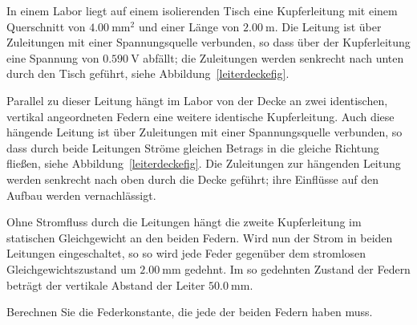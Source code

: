 In einem Labor liegt auf einem isolierenden Tisch eine Kupferleitung mit einem Querschnitt von \(\SI{4,00}{\milli\meter\squared}\) und einer Länge von \(\SI{2,00}{\meter}\). Die Leitung ist über Zuleitungen mit einer Spannungsquelle verbunden, so dass über der Kupferleitung eine Spannung von \(\SI{0,590}{\volt}\) abfällt; die Zuleitungen werden senkrecht nach unten durch den Tisch geführt, siehe Abbildung~\ref{leiterdeckefig}.

Parallel zu dieser Leitung hängt im Labor von der Decke an zwei identischen, vertikal angeordneten Federn eine weitere identische Kupferleitung. Auch diese hängende Leitung ist über Zuleitungen mit einer Spannungsquelle verbunden, so dass durch beide Leitungen Ströme gleichen Betrags in die gleiche Richtung fließen, siehe Abbildung~\ref{leiterdeckefig}. Die Zuleitungen zur hängenden Leitung werden senkrecht nach oben durch die Decke geführt; ihre Einflüsse auf den Aufbau werden vernachlässigt.

Ohne Stromfluss durch die Leitungen hängt die zweite Kupferleitung im statischen Gleichgewicht an den beiden Federn. Wird nun der Strom in beiden Leitungen eingeschaltet, so so wird jede Feder gegenüber dem stromlosen Gleichgewichtszustand um \(\SI{2,00}{\milli\meter}\) gedehnt. Im so gedehnten Zustand der Federn beträgt der vertikale Abstand der Leiter \(\SI{50,0}{\milli\meter}\). 

Berechnen Sie die Federkonstante, die jede der beiden Federn haben muss.